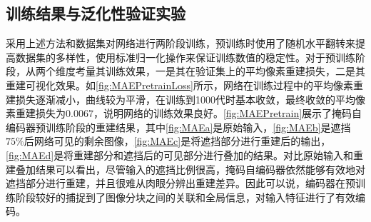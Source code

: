 \documentclass{Diploma}
\begin{document}
\subsection{训练结果与泛化性验证实验}
采用上述方法和数据集对网络进行两阶段训练，预训练时使用了随机水平翻转来提高数据集的多样性，使用标准归一化操作来保证训练数值的稳定性。对于预训练阶段，从两个维度考量其训练效果，一是其在验证集上的平均像素重建损失，二是其重建可视化效果。如\ref{fig:MAEPretrainLoss}所示，网络在训练过程中的平均像素重建损失逐渐减小，曲线较为平滑，在训练到1000代时基本收敛，最终收敛的平均像素重建损失为$0.0067$，说明网络的训练效果良好。\ref{fig:MAEPretrain}展示了掩码自编码器预训练阶段的重建结果，其中\ref{fig:MAEa}是原始输入，\ref{fig:MAEb}是遮挡$75\%$后网络可见的剩余图像，\ref{fig:MAEc}是将遮挡部分进行重建后的输出，\ref{fig:MAEd}是将重建部分和遮挡后的可见部分进行叠加的结果。对比原始输入和重建叠加结果可以看出，尽管输入的遮挡比例很高，掩码自编码器依然能够有效地对遮挡部分进行重建，并且很难从肉眼分辨出重建差异。因此可以说，编码器在预训练阶段较好的捕捉到了图像分块之间的关联和全局信息，对输入特征进行了有效编码。
\end{document}

